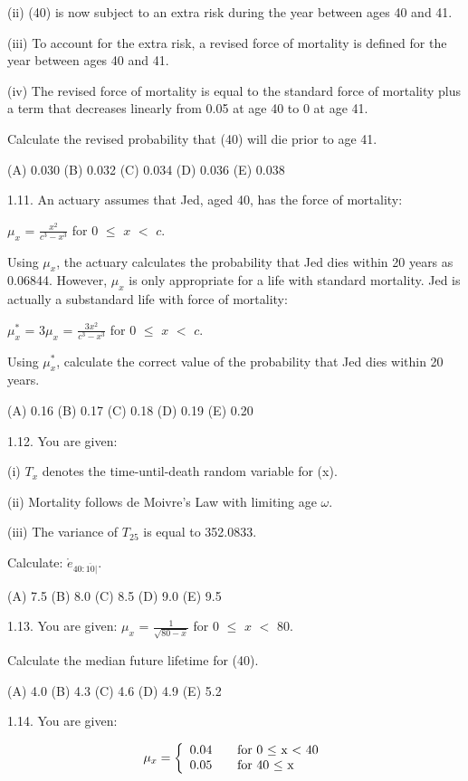 \documentclass[]{book}
\begin{document}
(ii) (40) is now subject to an extra risk during the year between ages
40 and 41.

(iii) To account for the extra risk, a revised force of mortality is
defined for the year between ages 40 and 41.

(iv) The revised force of mortality is equal to the standard force of
mortality plus a term that decreases linearly from 0.05 at age 40 to 0
at age 41.

Calculate the revised probability that (40) will die prior to age 41.

(A) 0.030 (B) 0.032 (C) 0.034 (D) 0.036 (E) 0.038

1.11. An actuary assumes that Jed, aged 40, has the force of mortality:

\(\mu_x\) = \(\frac{x^2}{c^3 - x^3}\) for 0 \(\le\) \(x\) \(<\) \(c\).

Using \(\mu_x\), the actuary calculates the probability that Jed dies
within 20 years as 0.06844. However, \(\mu_x\) is only appropriate for a
life with standard mortality. Jed is actually a substandard life with
force of mortality:

\(\mu^{*}_x\) = 3\(\mu_x\) = \(\frac{3x^2}{c^3 - x^3}\) for 0 \(\le\)
\(x\) \(<\) \(c\).

Using \(\mu^{*}_x\), calculate the correct value of the probability that
Jed dies within 20 years.

(A) 0.16 (B) 0.17 (C) 0.18 (D) 0.19 (E) 0.20

1.12. You are given:

(i) \(T_x\) denotes the time-until-death random variable for (x).

(ii) Mortality follows de Moivre's Law with limiting age \(\omega\).

(iii) The variance of \(T_{25}\) is equal to 352.0833.

Calculate: \(\mathring{e}_{40: \overline{10}|}\).

(A) 7.5 (B) 8.0 (C) 8.5 (D) 9.0 (E) 9.5

1.13. You are given: \(\mu_x\) = \(\frac{1}{\sqrt{80 - x}}\) for 0
\(\le\) \(x\) \(<\) 80.

Calculate the median future lifetime for (40).

(A) 4.0 (B) 4.3 (C) 4.6 (D) 4.9 (E) 5.2

1.14. You are given:

\[\mu_{x} = \left\{
  \begin{array}{l l}
    0.04 & \quad \text{for 0 $\le$ x $<$ 40}\\
    0.05 & \quad \text{for 40 $\le$ x}\\
  \end{array} \right.\]
\end{document}
